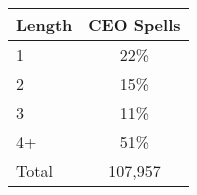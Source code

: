 \begin{tabular}{lc}
\toprule
Length & CEO Spells \\
\midrule
1 & 22\%  \\
2 & 15\%  \\
3 & 11\%  \\
4+ & 51\%  \\
Total &      107,957 \\
\bottomrule
\end{tabular}
